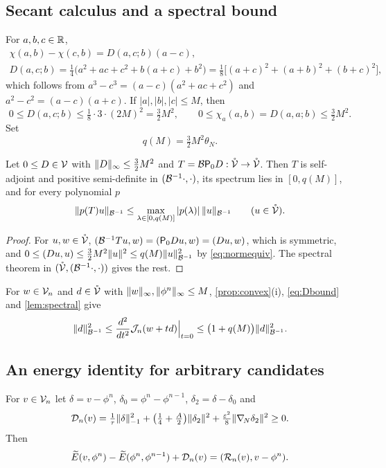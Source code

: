 \subsection{Secant calculus and a spectral bound}
For $a,b,c\in\mathbb{R}$,
\begin{equation}\label{eq:secantD}
\begin{gathered}
\chi(a,b)-\chi(c,b)=D(a,c;b)(a-c),\\
D(a,c;b)=\tfrac14\big(a^2+ac+c^2+b(a+c)+b^2\big)=\tfrac18\big[(a+c)^2+(a+b)^2+(b+c)^2\big],
\end{gathered}
\end{equation}
which follows from $a^3-c^3=(a-c)(a^2+ac+c^2)$ and $a^2-c^2=(a-c)(a+c)$. If $|a|,|b|,|c|\le M$, then
\begin{equation}\label{eq:Dbound}
0\le D(a,c;b)\le\tfrac18\cdot3\cdot(2M)^2=\tfrac32M^2,\qquad 0\le\chi_a(a,b)=D(a,a;b)\le\tfrac32M^2 .
\end{equation}
Set
\begin{equation}\label{eq:q}
q(M)=\tfrac32M^2\theta_N .
\end{equation}

\begin{lemma}\label{lem:spectral}
Let $0\le D\in\mathcal{V}$ with $\lVert D\rVert_\infty\le\frac32M^2$ and $T=\mathcal{B}\mathsf{P}_0 D:\mathring{\mathcal{V}}\to\mathring{\mathcal{V}}$. Then $T$ is self-adjoint and positive semi-definite in $(\mathcal{B}^{-1}\cdot,\cdot)$, its spectrum lies in $[0,q(M)]$, and for every polynomial $p$
\[
\lVert p(T)u\rVert_{\mathcal{B}^{-1}}\le\max_{\lambda\in[0,q(M)]}|p(\lambda)|\,\lVert u\rVert_{\mathcal{B}^{-1}}\qquad(u\in\mathring{\mathcal{V}}).
\]
\end{lemma}

\begin{proof}
For $u,w\in\mathring{\mathcal{V}}$, $(\mathcal{B}^{-1}Tu,w)=(\mathsf{P}_0 Du,w)=(Du,w)$, which is symmetric, and $0\le(Du,u)\le\frac32M^2\lVert u\rVert^2\le q(M)\lVert u\rVert_{\mathcal{B}^{-1}}^2$ by \eqref{eq:normequiv}. The spectral theorem in $(\mathring{\mathcal{V}},(\mathcal{B}^{-1}\cdot,\cdot))$ gives the rest.
\end{proof}

For $w\in\mathcal{V}_n$ and $d\in\mathring{\mathcal{V}}$ with $\lVert w\rVert_\infty,\lVert \phi^n\rVert_\infty\le M$, \cref{prop:convex}(i), \eqref{eq:Dbound} and \cref{lem:spectral} give
\begin{equation}\label{eq:hessbound}
\lVert d\rVert_{\mathcal{B}^{-1}}^2\le\frac{d^2}{dt^2}\mathcal{J}_n(w+td)\Big|_{t=0}\le\big(1+q(M)\big)\lVert d\rVert_{\mathcal{B}^{-1}}^2 .
\end{equation}

\subsection{An energy identity for arbitrary candidates}
\begin{theorem}\label{thm:identity}
For $v\in\mathcal{V}_n$ let $\delta=v-\phi^n$, $\delta_0=\phi^n-\phi^{n-1}$, $\delta_2=\delta-\delta_0$ and
\begin{equation}\label{eq:dissipation}
\mathcal{D}_n(v)=\tfrac1\tau\lVert \delta\rVert_{-1}^2+\big(\tfrac14+\tfrac A2\big)\lVert \delta_2\rVert^2+\tfrac{\varepsilon^2}8\lVert \nabla_{\!N}\delta_2\rVert^2\ge0 .
\end{equation}
Then
\begin{equation}\label{eq:identity}
\widetilde{E}(v,\phi^n)-\widetilde{E}(\phi^n,\phi^{n-1})+\mathcal{D}_n(v)=(\mathcal{R}_n(v),v-\phi^n).
\end{equation}
\end{theorem}

